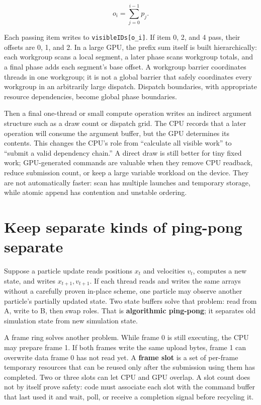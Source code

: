 \[
o_i=\sum_{j=0}^{i-1}p_j.
\]

Each passing item writes to \texttt{visibleIDs{[}o\_i{]}}. If item 0, 2, and 4 pass, their offsets are 0, 1, and 2. In a large GPU, the prefix sum itself is built hierarchically: each workgroup scans a local segment, a later phase scans workgroup totals, and a final phase adds each segment's base offset. A workgroup barrier coordinates threads in one workgroup; it is not a global barrier that safely coordinates every workgroup in an arbitrarily large dispatch. Dispatch boundaries, with appropriate resource dependencies, become global phase boundaries.

Then a final one-thread or small compute operation writes an indirect argument structure such as a draw count or dispatch grid. The CPU records that a later operation will consume the argument buffer, but the GPU determines its contents. This changes the CPU's role from ``calculate all visible work'' to ``submit a valid dependency chain.'' A direct draw is still better for tiny fixed work; GPU-generated commands are valuable when they remove CPU readback, reduce submission count, or keep a large variable workload on the device. They are not automatically faster: scan has multiple launches and temporary storage, while atomic append has contention and unstable ordering.

\section{Keep separate kinds of ping-pong separate}\label{05-engine-i-ch019-keep-separate-kinds-of-ping-pong-separate}

Suppose a particle update reads positions \(x_t\) and velocities \(v_t\), computes a new state, and writes \(x_{t+1},v_{t+1}\). If each thread reads and writes the same arrays without a carefully proven in-place scheme, one particle may observe another particle's partially updated state. Two state buffers solve that problem: read from A, write to B, then swap roles. That is \textbf{algorithmic ping-pong}; it separates old simulation state from new simulation state.

A frame ring solves another problem. While frame 0 is still executing, the CPU may prepare frame 1. If both frames write the same upload bytes, frame 1 can overwrite data frame 0 has not read yet. A \textbf{frame slot} is a set of per-frame temporary resources that can be reused only after the submission using them has completed. Two or three slots can let CPU and GPU overlap. A slot count does not by itself prove safety: code must associate each slot with the command buffer that last used it and wait, poll, or receive a completion signal before recycling it.

